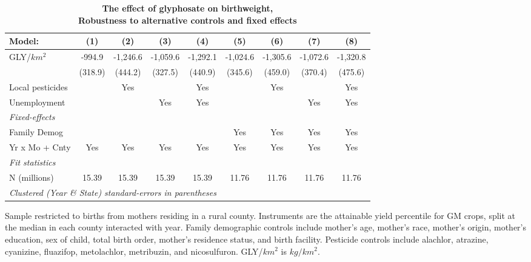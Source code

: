 \begin{table}[htbp]
   \centering
   \small
   \begin{threeparttable}[b]
      \caption{\label{tab:robust-cntrl-dbwt-allyielddiffgmo500} \textbf{The effect of glyphosate on birthweight, \\ Robustness to alternative controls and fixed effects}}
      \begin{tabular}{lcccccccc}
         \toprule
         Model:           & (1)     & (2)      & (3)      & (4)      & (5)      & (6)      & (7)      & (8)\\  
         \midrule 
         GLY/$km^2$       & -994.9  & -1,246.6 & -1,059.6 & -1,292.1 & -1,024.6 & -1,305.6 & -1,072.6 & -1,320.8\\   
                          & (318.9) & (444.2)  & (327.5)  & (440.9)  & (345.6)  & (459.0)  & (370.4)  & (475.6)\\   
         Local pesticides &         & Yes      &          & Yes      &          & Yes      &          & Yes\\  
         Unemployment     &         &          & Yes      & Yes      &          &          & Yes      & Yes\\  
         \midrule
         \emph{Fixed-effects}\\
         Family Demog     &         &          &          &          & Yes      & Yes      & Yes      & Yes\\  
         Yr x Mo + Cnty   & Yes     & Yes      & Yes      & Yes      & Yes      & Yes      & Yes      & Yes\\  
         \midrule
         \emph{Fit statistics}\\
         N (millions)     & 15.39   & 15.39    & 15.39    & 15.39    & 11.76    & 11.76    & 11.76    & 11.76\\  
         \midrule
         \multicolumn{9}{l}{\emph{Clustered (Year \& State) standard-errors in parentheses}}\\
      \end{tabular}
      
      \begin{tablenotes}\item Sample restricted to births from mothers residing in a rural county. Instruments are the attainable yield percentile for GM crops, split at the median in each county interacted with year. Family demographic controls include mother's age, mother's race, mother's origin, mother's education, sex of child, total birth order, mother's residence status, and birth facility. Pesticide controls include alachlor, atrazine, cyanizine, fluazifop, metolachlor, metribuzin, and nicosulfuron. GLY/$km^2$ is $kg/km^2$.
      \end{tablenotes}
   \end{threeparttable}
\end{table}
